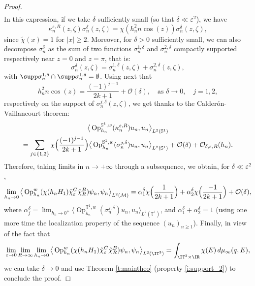 \documentclass[JEP,XML,SOM,Unicode, NoEqCountersInSection,published]{cedram}
\theoremstyle{plain}
\theoremstyle{definition}
\theoremstyle{remark}
\newcommand{\Op}{\operatorname{Op}}
\begin{document}
\begin{proof}
\begin{align*}
\end{align*}
In this expression, if we take $\delta$ sufficiently small (\ie so that $\delta \ll\varepsilon^2$), we have
\[
\kappa_n^{\varepsilon,R}(z,\zeta) \sigma_n^\delta(z,\zeta) = \chi(h_n^2 n \cos(z)) \sigma_n^\delta(z,\zeta),
\]
since $\tilde{\chi}(x) = 1$ for $\vert x \vert \geq 2$. Moreover, for $\delta > 0$ sufficiently small, we can also decompose $\sigma_n^\delta$ as the sum of two functions $\sigma_n^{1,\delta}$ and $\sigma_n^{2,\delta}$ compactly supported respectively near $z = 0$ and $z = \pi$, that is:
\[
\sigma_n^\delta(z,\zeta) = \sigma_n^{1,\delta}(z,\zeta) + \sigma_n^{2,\delta}(z,\zeta),
\]
with $\supp \sigma_n^{1,\delta} \cap \supp \sigma_n^{1,\delta} = \emptyset$. Using next that
\[
h_n^2 n \cos(z) = \frac{(-1)^{j-1}}{2k+1} + \mathcal{O}(\delta), \quad \text{as } \delta \to 0, \quad j = 1,2,
\]
respectively on the support of $\sigma_n^{j,\delta}(z,\zeta)$, we get thanks to the Calderón-Vaillancourt theorem:
\begin{multline*}
\big \langle \Op_{h_n}^{\mathbb{S}^1,w} (\kappa_n^{\varepsilon,R}) u_n,u_n \big \rangle_{L^2(\mathbb{S}^1)} \\
= \sum_{j\in \{1,2 \}} \chi\Bigl(\frac{(-1)^{j-1}}{2k+1} \Bigr) \big \langle \Op_{h_n}^{\mathbb{S}^1,w} (\sigma_n^{j,\delta}) u_n,u_n \big \rangle_{L^2(\mathbb{S}^1)} + \mathcal{O}(\delta) + \mathcal{O}_{\delta,\varepsilon,R}(h_n).
\end{multline*}
Therefore, taking limits in $ n \to + \infty$ through a subsequence, we obtain, for $\delta \ll \varepsilon^2$,
\[
\lim_{h_n \to 0}\big \langle \Op_{h_n}^w(\chi(h_n H_1) \tilde{\chi}_\varepsilon^C \tilde{\chi}_R^B) \psi_n, \psi_n \big \rangle_{L^2(\mathcal{M})} = \alpha_1^\delta \chi \Bigl(\frac{1}{2k+1} \Bigr) + \alpha^\delta_2\chi\Bigl(\frac{-1}{2k+1} \Bigr) + \mathcal{O}(\delta),
\]
where $\alpha_j^\delta = \lim_{h_n \to 0^+} \big \langle \Op_{h_n}^{\mathbb{T}^1,w} (\sigma_n^{j,\delta}) u_n,u_n \big \rangle_{L^2(\mathbb{T}^1)}$, and $\alpha_1^\delta + \alpha_2^\delta = 1$ (using one more time the localization property of the sequence $(u_n)_{n\geq 1}$). Finally, in view of the fact that
\[
\lim_{\varepsilon \to 0} \lim_{R \to \infty} \lim_{h_n \to 0}\big \langle \Op_{h_n}^w(\chi(h_n H_1) \tilde{\chi}_\varepsilon^C \tilde{\chi}_R^B) \psi_n, \psi_n \big \rangle_{L^2(\IT^3)} = \int_{\IT^3\times \IR} \chi(E) \, d\mu_\infty(q,E),
\]
we can take $\delta \to 0$ and use Theorem \ref{t:maintheo} (property \eqref{i:support_2}) to conclude the proof.
\end{proof}
\end{document}

